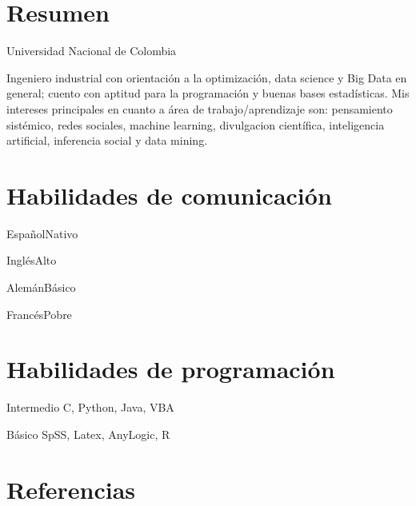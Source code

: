 \documentclass{tccv}
\begin{document}
\section{Resumen}
\begin{eventlist}
\item{Universidad Nacional de Colombia}
{  }
{  }

Ingeniero industrial con orientación a la optimización, data science y Big Data en general; cuento con aptitud para la programación y buenas bases estadísticas. Mis intereses principales en cuanto a área de trabajo/aprendizaje son: pensamiento sistémico, redes sociales, machine learning, divulgacion científica, inteligencia artificial, inferencia social y data mining. 
\end{eventlist}
\vspace{-6pt}
\section{Habilidades de comunicación}

\begin{factlist}
\item{Español}{Nativo}
\item{Inglés}{Alto}
\item{Alemán}{Básico}
\item{Francés}{Pobre}
\end{factlist}

\section{Habilidades de programación}

\begin{yearlist}

\item{Intermedio}
     {C, Python, Java, VBA}
     {}

\item{Básico}
     {SpSS, Latex, AnyLogic, R}
     {}

\end{yearlist}

\vspace{-6pt} %
\section{Referencias}
\end{document}
